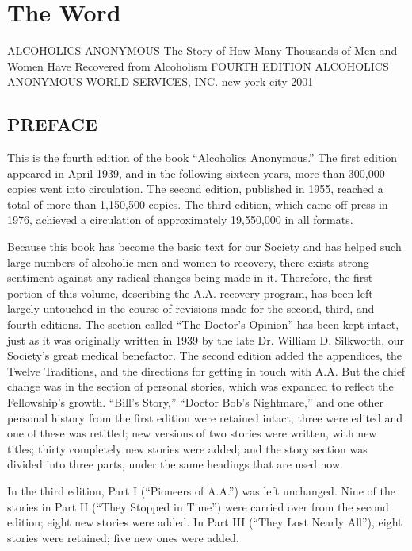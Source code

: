
\section{The Word}

ALCOHOLICS
ANONYMOUS
The Story of
How Many Thousands of Men and Women
Have Recovered from Alcoholism
FOURTH EDITION
ALCOHOLICS ANONYMOUS WORLD SERVICES, INC.
new york city
2001

\subsection{PREFACE}

This is the fourth edition of the book “Alcoholics Anonymous.”
The ﬁrst edition appeared in April 1939, and in the following sixteen years, more than 300,000 copies went into circulation.
The second edition, published in 1955, reached a total of more than 1,150,500 copies.
The third edition, which came off press in 1976, achieved a circulation of approximately 19,550,000 in all formats.

Because this book has become the basic text for our Society and has helped such large numbers of alcoholic men and women to recovery, there exists strong sentiment against any radical changes being made in it.
Therefore, the ﬁrst portion of this volume, describing the A.A. recovery program, has been left largely untouched in the course of revisions made for the second, third, and fourth editions.
The section called “The Doctor’s Opinion” has been kept intact, just as it was originally written in 1939 by the late Dr. William D. Silkworth, our Society’s great medical benefactor.
The second edition added the appendices, the Twelve Traditions, and the directions for getting in touch with A.A.
But the chief change was in the section of personal stories, which was expanded to reflect the Fellowship’s growth.
“Bill’s Story,” “Doctor Bob’s Nightmare,” and one other personal history from the first edition were retained intact; 
three were edited and one of these was retitled; 
new versions of two stories were written, with new titles; 
thirty completely new stories were added; 
and the story section was divided into three parts, under the same headings that are used now.

In the third edition, Part I (“Pioneers of A.A.”) was left unchanged.
Nine of the stories in Part II (“They Stopped in Time”) were carried over from the second edition; 
eight new stories were added.
In Part III (“They Lost Nearly All”), eight stories were retained; five new ones were added. 

